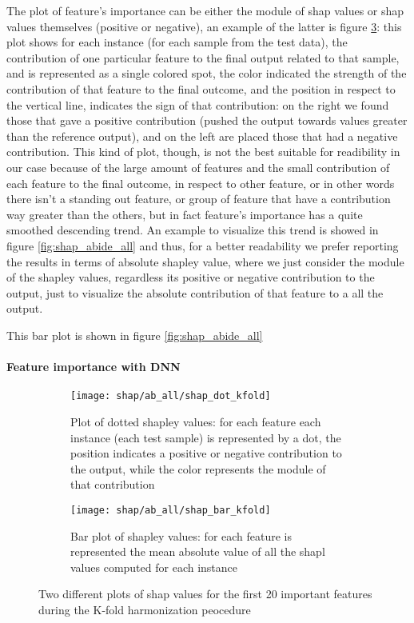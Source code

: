 \documentclass[11pt]{report}
\begin{document}
The plot of feature's importance can be either the module of shap values or shap values themselves (positive or negative), an example of the latter is figure \ref{fig:shap_features_kfold_both}: this plot shows for each instance (for each sample from the test data), the contribution of one particular feature to the final output related to that sample, and is represented as a single colored spot, the color indicated the strength of the contribution of that feature to the final outcome, and the position in respect to the vertical line, indicates the sign of that contribution: on the right we found those that gave a positive contribution (pushed the output towards values greater than the reference output), and on the left are placed those that had a negative contribution.
This kind of plot, though, is not the best suitable for readibility in our case because of the large amount of features and the small contribution of each feature to the final outcome, in respect to other feature, or in other words there isn't a standing out feature, or group of feature that have a contribution way greater than the others, but in fact feature's importance has a quite smoothed descending trend.
An example to visualize this trend is showed in figure \ref{fig:shap_abide_all} and thus, for a better readability we prefer reporting the results in terms of absolute shapley value, where we just consider the module of the shapley values, regardless its positive or negative contribution to the output, just to visualize the absolute contribution of that feature to a all the output.


This bar plot is shown in figure \ref{fig:shap_abide_all}

\paragraph{Feature importance with DNN}


\begin{figure}
\centering
\begin{subfigure}[b]{.45\textwidth}
   \texttt{[image: shap/ab\_all/shap\_dot\_kfold]}
   \caption{Plot of dotted shapley values: for each feature each instance (each test sample) is represented by a dot, the position indicates a positive or negative contribution to the output, while the color represents the module of that contribution}
   \label{}
\end{subfigure}
\begin{subfigure}[b]{.45\textwidth}
   \texttt{[image: shap/ab\_all/shap\_bar\_kfold]}
   \caption{Bar plot of shapley values: for each feature is represented the mean absolute value of all the shapl values computed for each instance}
   \label{}
\end{subfigure}
\caption{Two different plots of shap values for the first 20 important features during the K-fold harmonization peocedure}
\label{fig:shap_features_kfold_both}
\end{figure}
\end{document}
